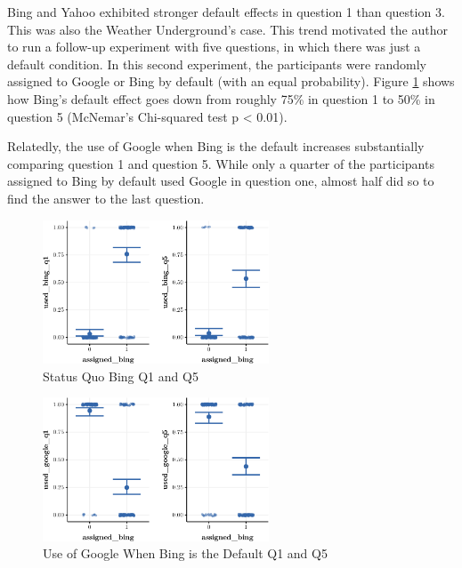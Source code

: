 \documentclass[
  11pt,
]{article}
\begin{document}
Bing and Yahoo exhibited stronger default effects in question 1 than question 3. This was also the Weather Underground's case. This trend motivated the author to run a follow-up experiment with five questions, in which there was just a default condition. In this second experiment, the participants were randomly assigned to Google or Bing by default (with an equal probability). Figure \ref{fig:Bing1v5} shows how Bing's default effect goes down from roughly 75\% in question 1 to 50\% in question 5 (McNemar's Chi-squared test p \textless{} 0.01).

Relatedly, the use of Google when Bing is the default increases substantially comparing question 1 and question 5. While only a quarter of the participants assigned to Bing by default used Google in question one, almost half did so to find the answer to the last question.

\begin{figure}

{\centering \includegraphics[width=0.6\textwidth]{Results-July19-307_files/figure-latex/Bing1v5-1} 

}

\caption{Status Quo Bing Q1 and Q5}\label{fig:Bing1v5}
\end{figure}

\begin{figure}

{\centering \includegraphics[width=0.6\textwidth]{Results-July19-307_files/figure-latex/GoogBD1v5-1} 

}

\caption{Use of Google When Bing is the Default Q1 and Q5}\label{fig:GoogBD1v5}
\end{figure}
\end{document}
